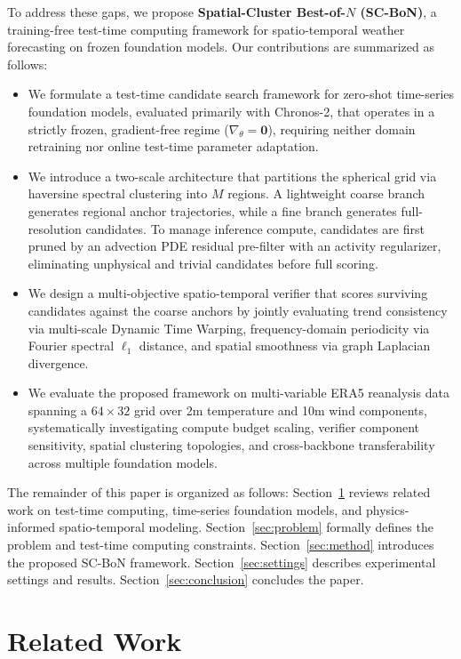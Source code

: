 \documentclass[preprint,12pt]{elsarticle}
\begin{document}
To address these gaps, we propose \textbf{Spatial-Cluster Best-of-$N$ (SC-BoN)}, a training-free test-time computing framework for spatio-temporal weather forecasting on frozen foundation models. Our contributions are summarized as follows:
\begin{itemize}
    \item We formulate a test-time candidate search framework for zero-shot time-series foundation models, evaluated primarily with Chronos-2, that operates in a strictly frozen, gradient-free regime ($\nabla_\theta = \mathbf{0}$), requiring neither domain retraining nor online test-time parameter adaptation.
    \item We introduce a two-scale architecture that partitions the spherical grid via haversine spectral clustering into $M$ regions. A lightweight coarse branch generates regional anchor trajectories, while a fine branch generates full-resolution candidates. To manage inference compute, candidates are first pruned by an advection PDE residual pre-filter with an activity regularizer, eliminating unphysical and trivial candidates before full scoring.
    \item We design a multi-objective spatio-temporal verifier that scores surviving candidates against the coarse anchors by jointly evaluating trend consistency via multi-scale Dynamic Time Warping, frequency-domain periodicity via Fourier spectral $\ell_1$ distance, and spatial smoothness via graph Laplacian divergence.
    \item We evaluate the proposed framework on multi-variable ERA5 reanalysis data spanning a $64 \times 32$ grid over 2m temperature and 10m wind components, systematically investigating compute budget scaling, verifier component sensitivity, spatial clustering topologies, and cross-backbone transferability across multiple foundation models.
\end{itemize}

The remainder of this paper is organized as follows: Section~\ref{sec:related_work} reviews related work on test-time computing, time-series foundation models, and physics-informed spatio-temporal modeling. Section~\ref{sec:problem} formally defines the problem and test-time computing constraints. Section~\ref{sec:method} introduces the proposed SC-BoN framework. Section~\ref{sec:settings} describes experimental settings and results. Section~\ref{sec:conclusion} concludes the paper.

\section{Related Work}
\label{sec:related_work}
\end{document}
